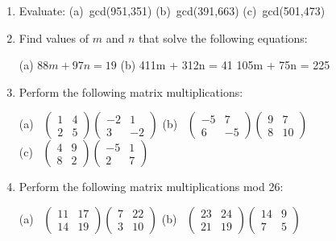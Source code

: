 \begin{enumerate}[(1)]
\item
Evaluate:  (a)~gcd(951,351) \qquad (b)~gcd(391,663) \qquad (c)~gcd(501,473)
\item
Find values of $m$ and $n$ that solve the following equations:

(a) $88m + 97n = 19$ \qquad (b) 411m + 312n = 41 \qquad 105m + 75n = 225
\item
Perform the following matrix multiplications:

(a)~
$\left(
\begin{array}{cc}
1 & 4 \\
2 & 5
\end{array}
\right)
\left(
\begin{array}{cc}
-2 & 1 \\
3 & -2
\end{array}
\right)$ \qquad
(b)~
$\left(
\begin{array}{cc}
-5 & 7 \\
6 & -5
\end{array}
\right)
\left(
\begin{array}{cc}
9 & 7 \\
8 & 10
\end{array}
\right)$ \\

(c)~
$\left(
\begin{array}{cc}
4 & 9 \\
8 & 2
\end{array}
\right)
\left(
\begin{array}{cc}
-5 & 1 \\
2 & 7
\end{array}
\right)$ 
\item
Perform the following matrix multiplications mod 26:

(a)~
$\left(
\begin{array}{cc}
11 & 17 \\
14 & 19
\end{array}
\right)
\left(
\begin{array}{cc}
7 & 22 \\
3 & 10
\end{array}
\right)$ \quad
(b)~
$\left(
\begin{array}{cc}
23 & 24 \\
21 & 19
\end{array}
\right)
\left(
\begin{array}{cc}
14 & 9 \\
7 & 5
\end{array}
\right)$
\end{enumerate}
\bigskip


